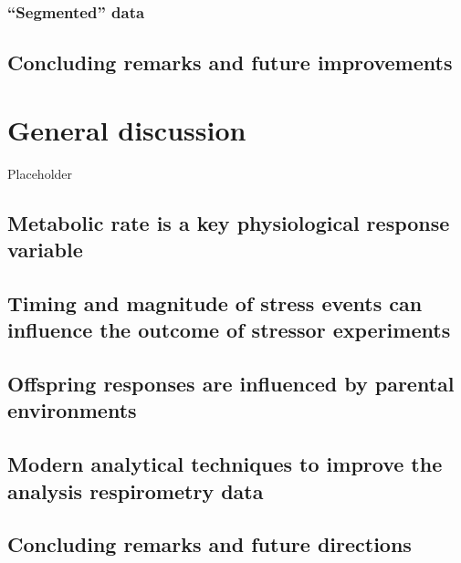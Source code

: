 \documentclass[
  oneside, 11pt, a4paper]{memoir}
\begin{document}
\hypertarget{segmented-data-1}{%
\subsection{\texorpdfstring{\enquote{Segmented} data}{``Segmented'' data}}\label{segmented-data-1}}

\hypertarget{concluding-remarks-and-future-improvements}{%
\section{Concluding remarks and future improvements}\label{concluding-remarks-and-future-improvements}}

\hypertarget{general-discussion}{%
\chapter{General discussion}\label{general-discussion}}

Placeholder

\hypertarget{metabolic-rate-is-a-key-physiological-response-variable}{%
\section{Metabolic rate is a key physiological response variable}\label{metabolic-rate-is-a-key-physiological-response-variable}}

\hypertarget{timing-and-magnitude-of-stress-events-can-influence-the-outcome-of-stressor-experiments}{%
\section{Timing and magnitude of stress events can influence the outcome of stressor experiments}\label{timing-and-magnitude-of-stress-events-can-influence-the-outcome-of-stressor-experiments}}

\hypertarget{offspring-responses-are-influenced-by-parental-environments}{%
\section{Offspring responses are influenced by parental environments}\label{offspring-responses-are-influenced-by-parental-environments}}

\hypertarget{modern-analytical-techniques-to-improve-the-analysis-respirometry-data}{%
\section{Modern analytical techniques to improve the analysis respirometry data}\label{modern-analytical-techniques-to-improve-the-analysis-respirometry-data}}

\hypertarget{concluding-remarks-and-future-directions}{%
\section{Concluding remarks and future directions}\label{concluding-remarks-and-future-directions}}
\end{document}
